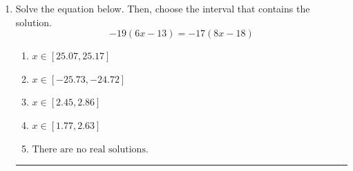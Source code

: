 \documentclass[14pt]{extbook}
\newcommand{\litem}[1]{\item#1\hspace*{-1cm}\rule{\textwidth}{0.4pt}}
\begin{document}
\begin{enumerate}
{\begin{enumerate}[label=\Alph*.]
\end{enumerate} }
\litem{
Solve the equation below. Then, choose the interval that contains the solution.\[ -19(6x -13) = -17(8x -18) \]\begin{enumerate}[label=\Alph*.]
\item \( x \in [25.07, 25.17] \)
\item \( x \in [-25.73, -24.72] \)
\item \( x \in [2.45, 2.86] \)
\item \( x \in [1.77, 2.63] \)
\item \( \text{There are no real solutions.} \)

\end{enumerate} }
\end{enumerate}
\end{document}
